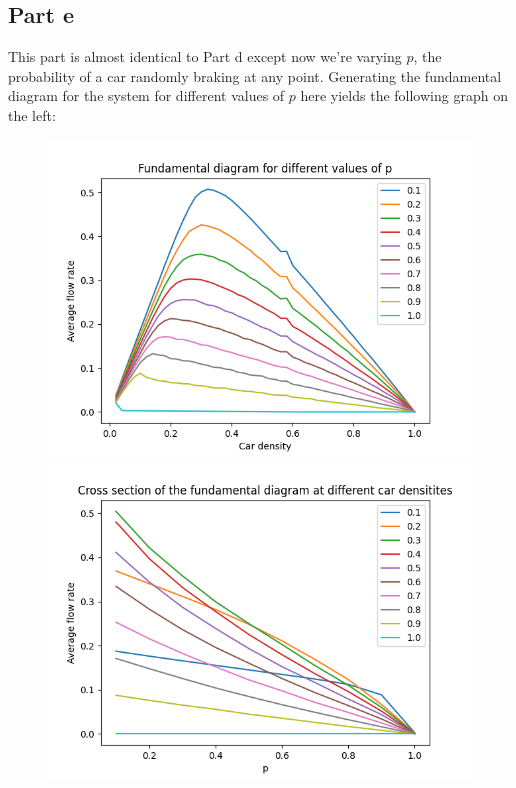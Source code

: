 \documentclass[a4paper,12pt]{article}
\begin{document}
\subsection*{Part e}

This part is almost identical to Part d except now we're varying $p$, the probability of a car randomly braking at
any point. Generating the fundamental diagram for the system for different values of $p$ here yields the following
graph on the left:

\begin{figure}[!ht]
  \centering
  \begin{minipage}{0.48\textwidth}
    \includegraphics[width=\textwidth]{img/2_2e_fundamental.png}
  \end{minipage}
  \begin{minipage}{0.48\textwidth}
    \includegraphics[width=\textwidth]{img/2_2e_flowrate_p_2.png}
  \end{minipage}
\end{figure}
\end{document}
